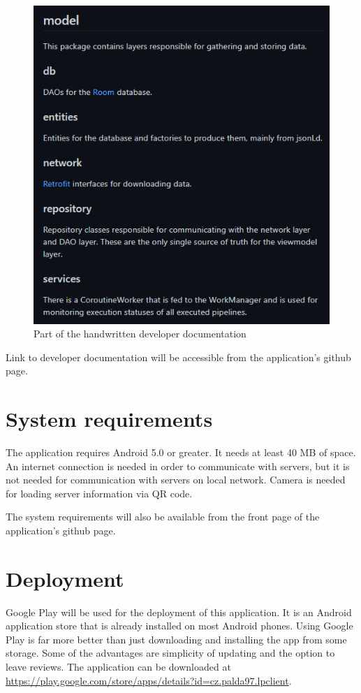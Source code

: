 \begin{figure}\centering
	\includegraphics[width=1\textwidth]{pics/developerDocumentation.png}
	\caption[Part of the handwritten developer documentation]{Part of the handwritten developer documentation}\label{fig:developerdocumentation}
\end{figure}

Link to developer documentation will be accessible from the application's github page.

\section{System requirements}
The application requires Android 5.0 or greater.
It needs at least 40 MB of space.
An internet connection is needed in order to communicate with servers, but it is not needed for communication with servers on local network.
Camera is needed for loading server information via QR code.

The system requirements will also be available from the front page of the application's github page.

\section{Deployment}
Google Play will be used for the deployment of this application.
It is an Android application store that is already installed on most Android phones.
Using Google Play is far more better than just downloading and installing the app from some storage.
Some of the advantages are simplicity of updating and the option to leave reviews.
The application can be downloaded at \url{https://play.google.com/store/apps/details?id=cz.palda97.lpclient}.